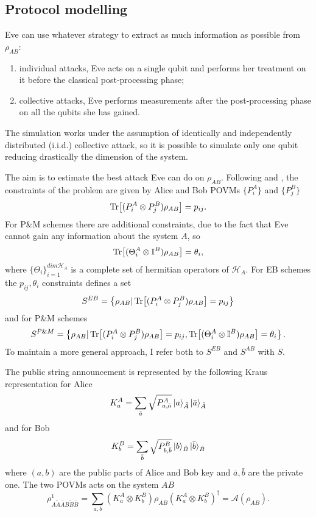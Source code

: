 \documentclass{article}
\begin{document}
    \subsection{Protocol modelling}
    Eve can use whatever strategy to extract as much information as possible from \(\rho_{AB}\):
    \begin{enumerate}
        \item individual attacks, Eve acts on a single qubit and performs her treatment on it before the classical post-processing phase;
        \item collective attacks, Eve performs measurements after the post-processing phase on all the qubits she has gained.
    \end{enumerate}
    The simulation works under the assumption of identically and independently distributed (i.i.d.) collective attack, so it is possible to simulate only one qubit reducing drastically the dimension of the system.

    The aim is to estimate the best attack Eve can do on \(\rho_{AB}\).
    Following \cite{George_2021} and \cite{Winick2018reliablenumerical}, the constraints of the problem are given by Alice and Bob POVMs \(\{P^A_i\}\) and \(\{P^B_j\}\)
    \begin{equation}
        \Tr[(P^A_i\otimes P^B_j) \rho_{AB} ] = p_{ij}.
        \label{eqn:constraints1}
    \end{equation}
    For P\&M schemes there are additional constraints, due to the fact that Eve cannot gain any information about the system \(A\), so
    \begin{equation}
        \Tr[(\Theta^A_i\otimes\mathbb{I}^B)\rho_{AB}] = \theta_i,
        \label{eqn:constraints2}
    \end{equation}
    where \(\{\Theta_{i}\}_{i=1}^{dim \mathcal{H}_A}\) is a complete set of hermitian operators of \( \mathcal{H}_A \).
    For EB schemes the \(p_{ij}, \theta_i\) constraints defines a set
    \[S^{EB}=\left\{ \rho_{AB} | \Tr[(P^A_i\otimes P^B_j) \rho_{AB} ] = p_{ij}\right\}\]
    and for P\&M schemes
    \[S^{P\&M}=\left\{\rho_{AB} | \Tr[(P^A_i\otimes P^B_j) \rho_{AB}] = p_{ij},  \Tr[(\Theta^A_i\otimes\mathbb{I}^B)\rho_{AB}] = \theta_i\right\}.\]
    To maintain a more general approach, I refer both to \(S^{EB}\) and \(S^{AB}\) with \(S\).

    The public string announcement is represented by the following Kraus representation for Alice
    \[K^A_{a} = \sum_{\bar{a}} \sqrt{P^A_{a,\bar{a}}} \ket{a}_{\tilde{A}}\ket{\bar{a}}_{\bar{A}} \]
    and for Bob
    \[K^B_{b} = \sum_{\bar{b}} \sqrt{P^B_{b,\bar{b}}} \ket{b}_{\tilde{B}}\ket{\bar{b}}_{\bar{B}} \]
    where \((a,b)\) are the public parts of Alice and Bob key and \(\bar{a},\bar{b}\) are the private one.
    The two POVMs acts on the system \(AB\)
    \begin{equation}
        \rho^1_{A\tilde{A}\bar{A}B\tilde{B}\bar{B}}=\sum_{a,b}(K^A_{a}\otimes K^B_b)\rho_{AB}(K^A_{a}\otimes K^B_b)^{\dagger}=\mathcal{A}(\rho_{AB}).
        \label{eqn:kraus}
    \end{equation}
\end{document}
